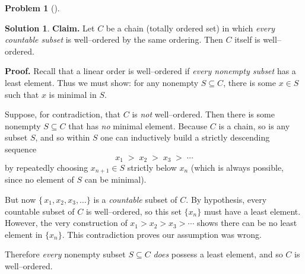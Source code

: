 \documentclass[12pt]{article}
\theoremstyle{definition} %
\newtheorem{solution}{Solution}
\newtheorem{problem}{Problem}
\theoremstyle{plain} %
\begin{document}
\begin{problem}[]
    
\end{problem}
\begin{solution}
    \textbf{Claim.}\; Let $C$ be a chain (totally ordered set) in which \emph{every countable subset} is well--ordered by the same ordering.  Then $C$ itself is well--ordered.

    \medskip
    
    \noindent
    \textbf{Proof.}\; 
    Recall that a linear order is well--ordered if \emph{every nonempty subset} has a least element.  
    Thus we must show: for any nonempty $S\subseteq C$, there is some $x\in S$ such that $x$ is minimal in $S$.
    
    \smallskip
    
    Suppose, for contradiction, that $C$ is \emph{not} well--ordered.  
    Then there is some nonempty $S\subseteq C$ that has \emph{no} minimal element.  
    Because $C$ is a chain, so is any subset $S$, and so within $S$ one can inductively build a strictly descending sequence
    \[
    x_1 \;>\; x_2 \;>\; x_3 \;>\;\cdots
    \]
    by repeatedly choosing $x_{n+1}\in S$ strictly below $x_n$ (which is always possible, since no element of $S$ can be minimal).
    
    \smallskip
    
    But now $\{\,x_1,x_2,x_3,\dots\}$ is a \emph{countable} subset of $C$.  
    By hypothesis, every countable subset of $C$ is well--ordered, so this set $\{x_n\}$ must have a least element.  
    However, the very construction of $x_1 > x_2 > x_3 >\cdots$ shows there can be no least element in $\{x_n\}$.  
    This contradiction proves our assumption was wrong.  
    
    Therefore \emph{every} nonempty subset $S\subseteq C$ \emph{does} possess a least element, 
    and so $C$ is well--ordered. 
\end{solution}
\end{document}
